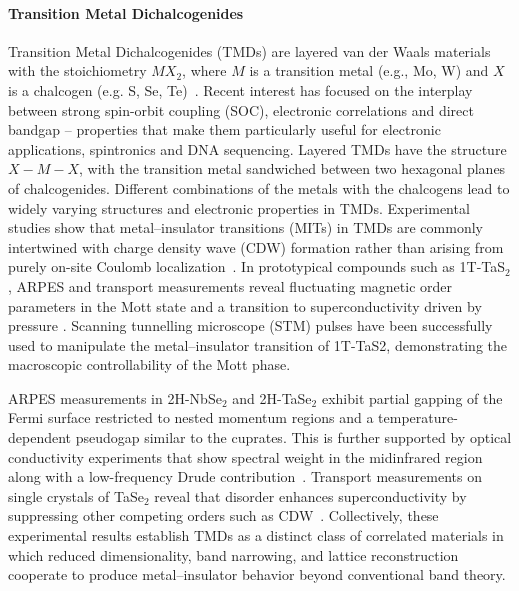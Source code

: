 \paragraph{Transition Metal Dichalcogenides}
Transition Metal Dichalcogenides (TMDs) are layered van der Waals materials with the stoichiometry $MX_2$, where $M$ is a transition metal (e.g., Mo, W) and $X$ is a chalcogen (e.g. S, Se, Te)~\cite{Manzeli2017,Joseph2023}. Recent interest has focused on the interplay between strong spin-orbit coupling (SOC), electronic correlations and direct bandgap -- properties that make them particularly useful for electronic applications, spintronics and DNA sequencing. Layered TMDs have the structure \(X-M-X\), with the transition metal sandwiched between two hexagonal planes of chalcogenides. Different combinations of the metals with the chalcogens lead to widely varying structures and electronic properties in TMDs. Experimental studies show that metal--insulator transitions (MITs) in TMDs are commonly intertwined with charge density wave (CDW) formation rather than arising from purely on-site Coulomb localization~\cite{Wilson1974PRL,Wilson2001}. In prototypical compounds such as 1T-TaS$_2$, ARPES and transport measurements reveal fluctuating magnetic order parameters in the Mott state and a transition to superconductivity driven by pressure \cite{Fazekas1979,Perfetti2005,Sipos2008}. Scanning tunnelling microscope (STM) pulses have been successfully used to manipulate the metal–insulator transition of 1T-TaS2, demonstrating the macroscopic controllability of the Mott phase\cite{Cho2016}.

ARPES measurements in 2H-NbSe$_2$ and 2H-TaSe$_2$ exhibit partial gapping of the Fermi surface restricted to nested momentum regions and a temperature-dependent pseudogap similar to the cuprates\cite{Borisenko2008,Borisenko2009}. This is further supported by optical conductivity experiments that show spectral weight in the midinfrared region along with a low-frequency Drude contribution~\cite{Vescoli1998}. Transport measurements on single crystals of TaSe$_2$ reveal that disorder enhances superconductivity by suppressing other competing orders such as CDW~\cite{Li2017}. Collectively, these experimental results establish TMDs as a distinct class of correlated materials in which reduced dimensionality, band narrowing, and lattice reconstruction cooperate to produce metal--insulator behavior beyond conventional band theory.

